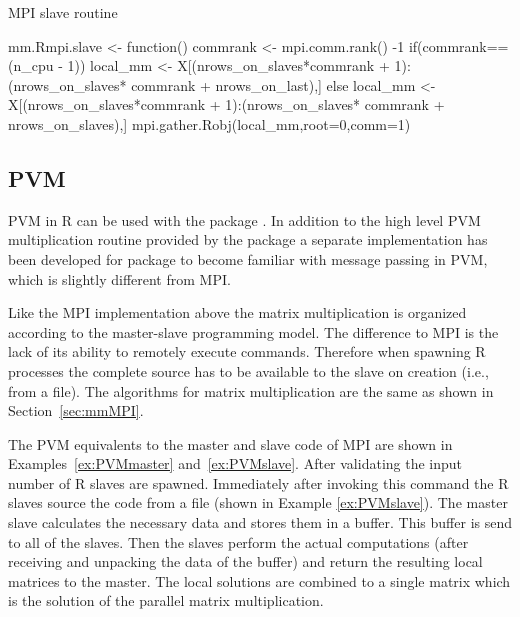 \begin{Example} MPI slave routine
\label{ex:MPIslave}
\begin{Scode}

mm.Rmpi.slave <- function(){
  commrank <- mpi.comm.rank() -1
  if(commrank==(n_cpu - 1))
    local_mm <- X[(nrows_on_slaves*commrank + 1):(nrows_on_slaves*
                   commrank + nrows_on_last),]%
  else
    local_mm <- X[(nrows_on_slaves*commrank + 1):(nrows_on_slaves*
                   commrank + nrows_on_slaves),]%
  mpi.gather.Robj(local_mm,root=0,comm=1)    
}
\end{Scode}
\end{Example}

\subsection{PVM}

PVM in R can be used with the package . In addition to the
high level PVM multiplication routine provided by the package
 a separate implementation has been developed for package
 to become familiar with message passing in PVM, which is
slightly different from MPI. 

Like the MPI implementation above the matrix multiplication is
organized according 
to the master-slave programming model. The difference to MPI is the
lack of its ability to remotely execute commands. Therefore when
spawning R processes the complete source has to be available to the
slave on creation (i.e., from a file). The algorithms for matrix
multiplication are the same as shown in Section~\ref{sec:mmMPI}.

The PVM equivalents to the master and slave code of MPI are shown in
Examples~\ref{ex:PVMmaster} and~\ref{ex:PVMslave}.
After validating the input  number of R slaves are
spawned. Immediately after invoking this command the R slaves source
the code from a file  (shown in Example
\ref{ex:PVMslave}). The master slave
calculates the necessary data and stores them in a buffer. This buffer
is send to all of the slaves. Then
the slaves perform the actual computations (after receiving and
unpacking the data of the buffer) and return the resulting
local matrices to the master. The local solutions are combined to a
single matrix which is the solution of the parallel matrix
multiplication.


